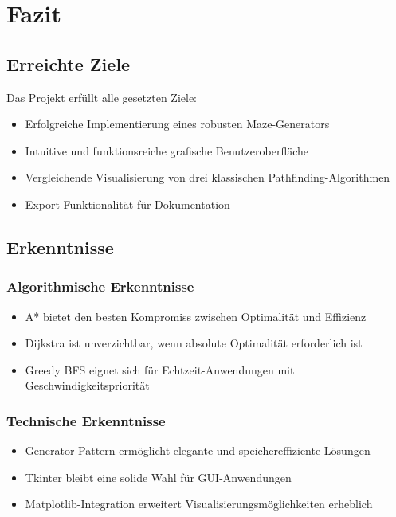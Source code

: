 \documentclass[12pt,a4paper]{article}
\begin{document}
\section{Fazit}

\subsection{Erreichte Ziele}

Das Projekt erfüllt alle gesetzten Ziele:
\begin{itemize}
    \item Erfolgreiche Implementierung eines robusten Maze-Generators
    \item Intuitive und funktionsreiche grafische Benutzeroberfläche
    \item Vergleichende Visualisierung von drei klassischen Pathfinding-Algorithmen
    \item Export-Funktionalität für Dokumentation
\end{itemize}

\subsection{Erkenntnisse}

\subsubsection{Algorithmische Erkenntnisse}
\begin{itemize}
    \item A* bietet den besten Kompromiss zwischen Optimalität und Effizienz
    \item Dijkstra ist unverzichtbar, wenn absolute Optimalität erforderlich ist
    \item Greedy BFS eignet sich für Echtzeit-Anwendungen mit Geschwindigkeitspriorität
\end{itemize}

\subsubsection{Technische Erkenntnisse}
\begin{itemize}
    \item Generator-Pattern ermöglicht elegante und speichereffiziente Lösungen
    \item Tkinter bleibt eine solide Wahl für GUI-Anwendungen
    \item Matplotlib-Integration erweitert Visualisierungsmöglichkeiten erheblich
\end{itemize}
\end{document}
